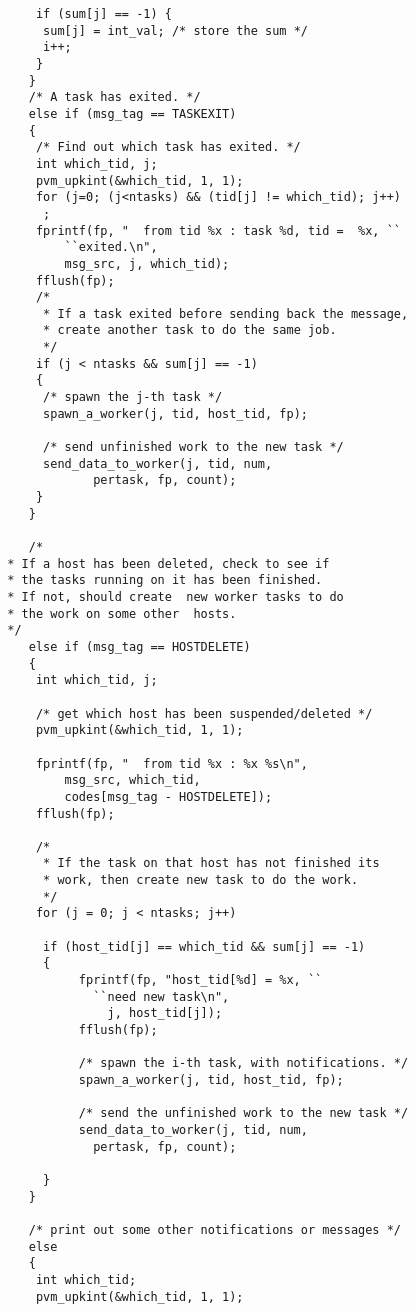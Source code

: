 \begin{small}
\begin{verbatim}
		    if (sum[j] == -1) {
			 sum[j] = int_val; /* store the sum */
			 i++;
		    }
	       }
	       /* A task has exited. */
	       else if (msg_tag == TASKEXIT) 
	       {
		    /* Find out which task has exited. */ 
		    int which_tid, j;	       
		    pvm_upkint(&which_tid, 1, 1);
		    for (j=0; (j<ntasks) && (tid[j] != which_tid); j++)
			 ;
		    fprintf(fp, "  from tid %x : task %d, tid =  %x, ``
			    ``exited.\n", 
			    msg_src, j, which_tid);
		    fflush(fp);
		    /* 
		     * If a task exited before sending back the message,
		     * create another task to do the same job.
		     */
		    if (j < ntasks && sum[j] == -1) 
		    {
			 /* spawn the j-th task */
			 spawn_a_worker(j, tid, host_tid, fp);
			 
			 /* send unfinished work to the new task */
			 send_data_to_worker(j, tid, num, 
					pertask, fp, count);
		    }
	       }
	       
	       /* 
		* If a host has been deleted, check to see if 
		* the tasks running on it has been finished.  
		* If not, should create  new worker tasks to do 
		* the work on some other  hosts.
		*/
	       else if (msg_tag == HOSTDELETE)
	       {
		    int which_tid, j;
		    
		    /* get which host has been suspended/deleted */
		    pvm_upkint(&which_tid, 1, 1);
		    
		    fprintf(fp, "  from tid %x : %x %s\n", 
			    msg_src, which_tid, 
			    codes[msg_tag - HOSTDELETE]);
		    fflush(fp);
		    
		    /* 
		     * If the task on that host has not finished its
		     * work, then create new task to do the work.
		     */
		    for (j = 0; j < ntasks; j++)
			 
			 if (host_tid[j] == which_tid && sum[j] == -1)
			 {
			      fprintf(fp, "host_tid[%d] = %x, ``
					``need new task\n",
				      j, host_tid[j]);
			      fflush(fp);
			      
			      /* spawn the i-th task, with notifications. */
			      spawn_a_worker(j, tid, host_tid, fp);
			      
			      /* send the unfinished work to the new task */
			      send_data_to_worker(j, tid, num, 
					pertask, fp, count);
			      
			 }
	       }
	       
	       /* print out some other notifications or messages */
	       else 
	       {
		    int which_tid;
		    pvm_upkint(&which_tid, 1, 1);
		    

\end{verbatim}
\end{small}
